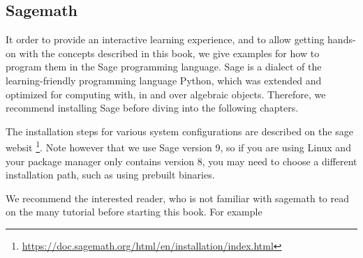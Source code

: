 \subsection{Sagemath}
\label{sagemath_setup}
It order to provide an interactive learning experience, and to allow getting hands-on with the concepts described in this book, we give examples for how to program them in the Sage programming language. Sage is a dialect of the learning-friendly programming language Python, which was extended and optimized for computing with, in and over algebraic objects. Therefore, we recommend installing Sage before diving into the following chapters.

The installation steps for various system configurations are described on the sage websit \footnote{\url{https://doc.sagemath.org/html/en/installation/index.html}}. Note however that we use Sage version 9, so if you are using Linux and your package manager only contains version 8, you may need to choose a different installation path, such as using prebuilt binaries.

We recommend the interested reader, who is not familiar with sagemath to read on the many tutorial before starting this book. For example 



